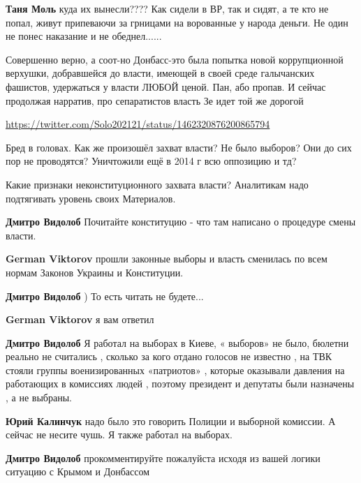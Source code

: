\begin{itemize}
\begin{itemize} %
\textbf{Таня Моль} куда их вынесли???? Как сидели в ВР, так и сидят, а те кто не попал, живут припеваючи за грницами на ворованные у народа деньги. Не один не понес наказание и не обеднел......
\end{itemize} %


Совершенно верно, а соот-но Донбасс-это была попытка новой коррупционной
верхушки, добравшейся до власти, имеющей в своей среде галычанских фашистов,
удержаться у власти ЛЮБОЙ ценой. Пан, або пропав. И сейчас продолжая нарратив,
про сепаратистов власть Зе идет той же дорогой


\url{https://twitter.com/Solo202121/status/1462320876200865794}


Бред в головах. Как же произошёл захват власти? Не было выборов? Они до сих пор
не проводятся? Уничтожили ещё в 2014 г всю оппозицию и тд?

Какие признаки неконституционного захвата власти?
Аналитикам надо подтягивать уровень своих Материалов.

\begin{itemize} %
\textbf{Дмитро Видолоб} Почитайте конституцию - что там написано о процедуре смены власти.

\textbf{German Viktorov} прошли законные выборы и власть сменилась по всем нормам Законов Украины и Конституции.

\textbf{Дмитро Видолоб} ) То есть читать не будете...

\textbf{German Viktorov} я вам ответил

\textbf{Дмитро Видолоб} Я работал на выборах в Киеве, « выборов» не было, бюлетни реально не считались , сколько за кого отдано голосов не известно , на ТВК стояли группы военизированных «патриотов» , которые оказывали давления на работающих в комиссиях людей , поэтому президент и депутаты были назначены , а не выбраны.

\textbf{Юрий Калинчук} надо было это говорить Полиции и выборной комиссии. А сейчас не несите чушь. Я также работал на выборах.

\textbf{Дмитро Видолоб} прокомментируйте пожалуйста исходя из вашей логики ситуацию с Крымом и Донбассом


\end{itemize}
\end{itemize}
